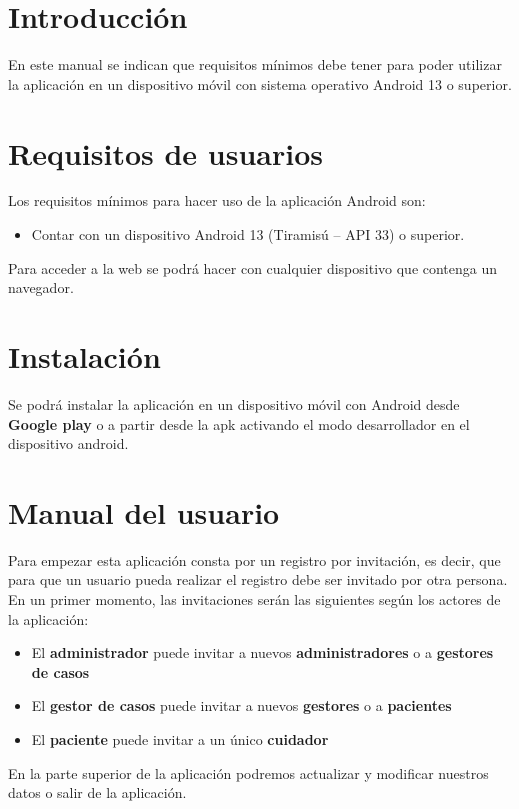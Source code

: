 
\section{Introducción}
En este manual se indican que requisitos mínimos debe tener para poder utilizar la aplicación en un dispositivo móvil con sistema operativo Android 13 o superior.

\section{Requisitos de usuarios}
Los requisitos mínimos para hacer uso de la aplicación Android son:
\begin{itemize}
	\item Contar con un dispositivo Android 13 (Tiramisú – API 33) o superior.
\end{itemize}

Para acceder a la web se podrá hacer con cualquier dispositivo que contenga un navegador.

\section{Instalación}
Se podrá instalar la aplicación en un dispositivo móvil con Android desde \textbf{Google play} o a partir desde la apk activando el modo desarrollador en el dispositivo android.

\section{Manual del usuario}
Para empezar esta aplicación consta por un registro por invitación, es decir, que para que un usuario pueda realizar el registro debe ser invitado por otra persona. En un primer momento, las invitaciones serán las siguientes según los actores de la aplicación:
\begin{itemize}
	\item El \textbf{administrador} puede invitar a nuevos \textbf{administradores} o a \textbf{gestores de casos}
	\item El \textbf{gestor de casos} puede invitar a nuevos \textbf{gestores} o a \textbf{pacientes}
	\item El \textbf{paciente} puede invitar a un único \textbf{cuidador}
\end{itemize}

En la parte superior de la aplicación podremos actualizar y modificar nuestros datos o salir de la aplicación.

